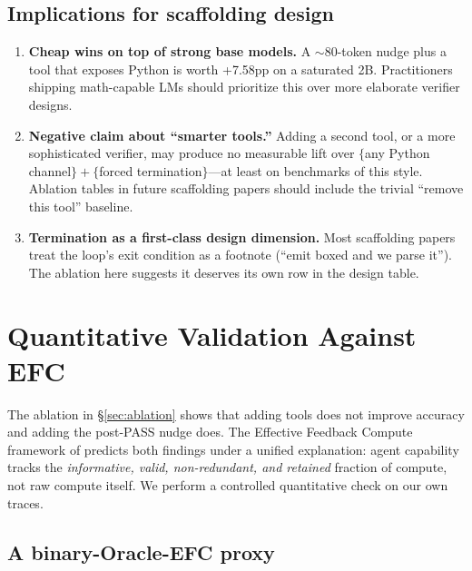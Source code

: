 \documentclass[10pt]{article}
\begin{document}
\subsection{Implications for scaffolding design}

\begin{enumerate}
  \item \textbf{Cheap wins on top of strong base models.} A $\sim$80-token nudge plus a tool that exposes Python is worth +7.58pp on a saturated 2B. Practitioners shipping math-capable LMs should prioritize this over more elaborate verifier designs.
  \item \textbf{Negative claim about ``smarter tools.''} Adding a second tool, or a more sophisticated verifier, may produce no measurable lift over $\{$any Python channel$\} + \{$forced termination$\}$---at least on benchmarks of this style. Ablation tables in future scaffolding papers should include the trivial ``remove this tool'' baseline.
  \item \textbf{Termination as a first-class design dimension.} Most scaffolding papers treat the loop's exit condition as a footnote (``emit boxed and we parse it''). The ablation here suggests it deserves its own row in the design table.
\end{enumerate}

\section{Quantitative Validation Against EFC}
\label{sec:efc-validation}

The ablation in \S\ref{sec:ablation} shows that adding tools does not improve accuracy and adding the post-PASS nudge does. The Effective Feedback Compute framework of \citet{efc2026} predicts both findings under a unified explanation: agent capability tracks the \emph{informative, valid, non-redundant, and retained} fraction of compute, not raw compute itself. We perform a controlled quantitative check on our own traces.

\subsection{A binary-Oracle-EFC proxy}
\end{document}

